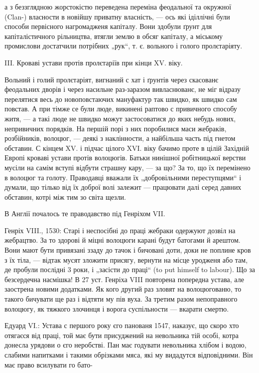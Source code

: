 \parcont{}
а з беззглядною жорстокістю переведена переміна феодальної та окружної (Clan-) власности в новійшу
приватну власність, — ось які іділлічні були способи первісного нагромадженя капіталу. Вони здобули
ґрунт для капіталістичного рільництва, втягли землю в обсяг капіталу, а міському промислови
достатчили потрібних „рук“, т. є. вольного і голого пролєтаріяту.

III.   Кроваві устави протів пролєтаріїв при кінци XV. віку.

Вольний і голий пролєтаріят, вигнаний с хат і ґрунтів через скасованє феодальних дворів і через
насильне раз-заразом вивласнюванє, не міг відразу перелятися весь до
новоповстаючих мануфактур так швидко, як швидко сам повстав. А при тімже се були люде, викинені
раптово с привичного способу житя, — а такі люде не швидко можут
застосоватися до яких небудь нових, непривичних порядків. На першій порі з них поробилися маси
жебраків, розбійників, волоцюг, — деякі з наклінности, а найбільша часть під гнетом обставин. С
кінцем XV. і підчас цілого XVI. віку бачимо проте в цілій Західній Европі кроваві устави протів
волоцюгів. Батьки нинішної робітницької верстви мусіли на самім вступі відбути страшну кару, — за
що? За то, що їх перемінено в волоцюг та голоту. Праводавці вважали їх „добровільними переступцями“
і думали, що тілько від їх доброї волі залежит — працювати далі серед давних обставин, котрі між тим
зо світа щезли.

В Англії почалось те праводавство під Генріхом VII.

Генріх VIII., 1530: Старі і неспосібні до праці жебраки одержуют дозвіл на жебрацтво. За то здорові
й міцні волоцюги карані будут батогами й арештом. Вони мают бути привязані ззаду до тачок і бичовані
доти, доки не поплине кров з їх тіла, — відтак мусят зложити присягу, вернути на місце уродженя або
там, де пробули послідні 3 роки, і „засісти до праці“ (to put himself to labour). Що за безсердечна
насмішка! В 27 уст. Генріха VIII повторена попередна устава, але заострена новими додатками. Як кого
другий раз зловят на волоцюгованю, то такого бичувати ще раз і відтяти му пів вуха. За третим разом
непоправного волоцюгу, як тяжкого злочинця і ворога суспільности —
вкарати смертю.

Едуард VI.: Устава с першого року єго панованя 1547, наказує, що скоро хто отягаєся від праці, той
має бути присуджений на невольника тій особі, котра донесла урядови
о єго неробстві. Пан має годувати невольника хлібом і водою, слабими напитками і такими обрізками
мяса, які му видадутся відповідними. Він має право всилувати го бато-

